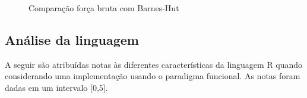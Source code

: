 \documentclass[rel_mlp]{iiufrgs}
\begin{document}
\begin{figure}[htb]
    \centering
    \caption{Comparação força bruta com Barnes-Hut}
    \label{fig:grafico}
\end{figure}



\subsection{Análise da linguagem}

A seguir são atribuídas notas às diferentes características da linguagem R quando considerando uma implementação usando o paradigma funcional. As notas foram dadas em um intervalo [0,5].
\end{document}
